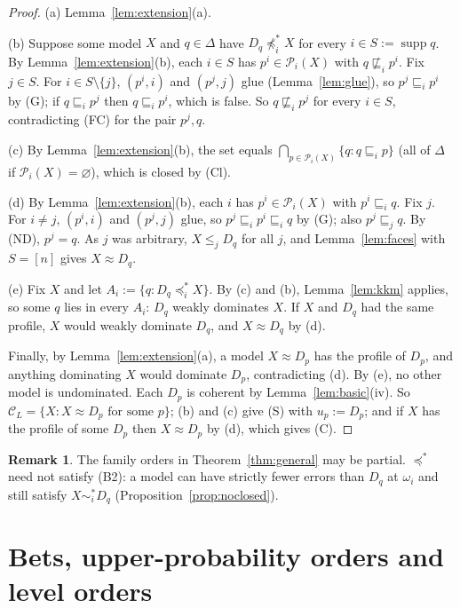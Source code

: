 \documentclass[11pt]{article}
\theoremstyle{definition}
\newtheorem{remark}[theorem]{Remark}
\newcommand{\supp}{\operatorname{supp}}
\newcommand{\Pc}{\mathcal P}
\newcommand{\ws}{\preceq^{*}}
\newcommand{\wst}{\sim^{*}}
\begin{document}
\begin{proof}
(a) Lemma~\ref{lem:extension}(a).

(b) Suppose some model $X$ and $q\in\Delta$ have $D_q\not\ws_iX$ for every $i\in S:=\supp q$. By Lemma~\ref{lem:extension}(b), each $i\in S$ has $p^i\in\Pc_i(X)$ with $q\not\sqsubseteq_ip^i$. Fix $j\in S$. For $i\in S\setminus\{j\}$, $(p^i,i)$ and $(p^j,j)$ glue (Lemma~\ref{lem:glue}), so $p^j\sqsubseteq_ip^i$ by (G); if $q\sqsubseteq_ip^j$ then $q\sqsubseteq_ip^i$, which is false. So $q\not\sqsubseteq_ip^j$ for every $i\in S$, contradicting (FC) for the pair $p^j,q$.

(c) By Lemma~\ref{lem:extension}(b), the set equals $\bigcap_{p\in\Pc_i(X)}\{q:q\sqsubseteq_ip\}$ (all of $\Delta$ if $\Pc_i(X)=\varnothing$), which is closed by (Cl).

(d) By Lemma~\ref{lem:extension}(b), each $i$ has $p^i\in\Pc_i(X)$ with $p^i\sqsubseteq_iq$. Fix $j$. For $i\ne j$, $(p^i,i)$ and $(p^j,j)$ glue, so $p^j\sqsubseteq_ip^i\sqsubseteq_iq$ by (G); also $p^j\sqsubseteq_jq$. By (ND), $p^j=q$. As $j$ was arbitrary, $X\le_jD_q$ for all $j$, and Lemma~\ref{lem:faces} with $S=[n]$ gives $X\approx D_q$.

(e) Fix $X$ and let $A_i:=\{q:D_q\ws_iX\}$. By (c) and (b), Lemma~\ref{lem:kkm} applies, so some $q$ lies in every $A_i$: $D_q$ weakly dominates $X$. If $X$ and $D_q$ had the same profile, $X$ would weakly dominate $D_q$, and $X\approx D_q$ by (d).

Finally, by Lemma~\ref{lem:extension}(a), a model $X\approx D_p$ has the profile of $D_p$, and anything dominating $X$ would dominate $D_p$, contradicting (d). By (e), no other model is undominated. Each $D_p$ is coherent by Lemma~\ref{lem:basic}(iv). So $\mathcal C_L=\{X:X\approx D_p\text{ for some }p\}$; (b) and (c) give (S) with $u_p:=D_p$; and if $X$ has the profile of some $D_p$ then $X\approx D_p$ by (d), which gives (C).
\end{proof}

\begin{remark}\label{rem:flat}
The family orders in Theorem~\ref{thm:general} may be partial. $\ws$ need not satisfy (B2): a model can have strictly fewer errors than $D_q$ at $\omega_i$ and still satisfy $X\wst_iD_q$ (Proposition~\ref{prop:noclosed}).
\end{remark}

\section{Bets, upper-probability orders and level orders}\label{sec:instances}
\end{document}
